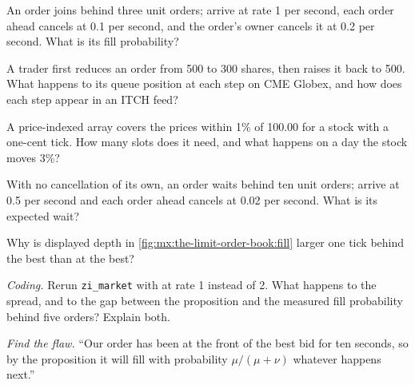 \begin{exercise}[$\star$]\label{exo:mx:the-limit-order-book:2}
An order joins behind three unit orders;  arrive at rate 1 per second, each order ahead cancels at 0.1 per second, and the order's
owner cancels it at 0.2 per second. What is its fill probability?
\end{exercise}

\begin{exercise}[$\star$]\label{exo:mx:the-limit-order-book:3}
A trader first reduces an order from 500 to 300 shares, then raises it back to 500. What happens to its queue position at each step on CME Globex,
and how does each step appear in an ITCH feed?
\end{exercise}

\begin{exercise}[$\star\star$]\label{exo:mx:the-limit-order-book:4}
A price-indexed array covers the prices within 1\% of 100.00 for a stock with a one-cent tick. How many slots does it need, and what happens on a
day the stock moves 3\%?
\end{exercise}

\begin{exercise}[$\star\star$]\label{exo:mx:the-limit-order-book:5}
With no cancellation of its own, an order waits behind ten unit orders;  arrive at 0.5 per second and each order ahead cancels at 0.02 per
second. What is its expected wait?
\end{exercise}

\begin{exercise}[$\star\star$]\label{exo:mx:the-limit-order-book:6}
Why is displayed depth in \cref{fig:mx:the-limit-order-book:fill} larger one tick behind the best than at the best?
\end{exercise}

\begin{exercise}[$\star\star\star$]\label{exo:mx:the-limit-order-book:7}
\emph{Coding.} Rerun \texttt{zi\_market} with  at rate 1 instead of 2. What happens to the spread, and to the gap between the
proposition and the measured fill probability behind five orders? Explain both.
\end{exercise}

\begin{exercise}[$\star\star\star$]\label{exo:mx:the-limit-order-book:8}
\emph{Find the flaw.} ``Our order has been at the front of the best bid for ten seconds, so by the proposition it will fill with probability
$\mu/(\mu+\nu)$ whatever happens next.''
\end{exercise}

